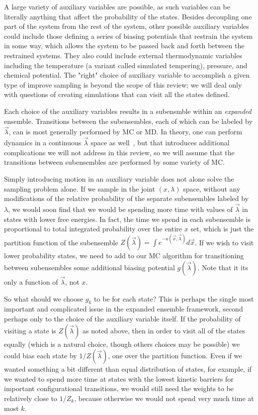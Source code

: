 \documentclass[superscriptaddress,showkeys, nofootinbib, pre, aps]{revtex4-1}
\begin{document}
A large variety of auxiliary variables are possible, as such variables can be literally anything that affect the probability of the states. Besides decoupling one part of the system from the rest of the system, other possible auxiliary variables could include those defining a series of biasing potentials that restrain the system in some way, which allows the system to be passed back and forth between the restrained systems. They also could include external thermodynamic variables including the temperature (a variant called simulated tempering), pressure, and chemical potential.  The "right" choice of auxiliary variable to accomplish a given type of improve sampling is beyond the scope of this review; we will deal only with questions of creating simulations that can visit all the states defined.

Each choice of the auxiliary variables results in a subensmble within an \emph{expanded}
ensemble.  Transitions between the subensembles, each of which can be labeled by $\vec{\lambda}$, can is most generally performed by MC or MD. In theory, one can perform dynamics in a continuous $\vec{\lambda}$ space as well~\cite{lambda_dynamics}, but that introduces additional complications we will not address in this review, so we will assume that the transitions between subensembles are performed by some variety of MC.

Simply introducing motion in an auxiliary variable does not alone solve the sampling problem alone. If we sample in the joint $(x,\lambda)$ space, without any modifications of the relative probability of the separate subensembles labeled by $\lambda$, we would soon find that we would be spending more time with values of $\vec{\lambda}$ in states with lower free energies. In fact, the time we spend in each subensemble is proportional to total integrated probability over the entire $x$ set, which is just the partition function of the subensemble $Z(\vec{\lambda}) = \int e^{-u(\vec{x},\vec{\lambda})} d\vec{x}$. If we wish to visit lower probability states, we need to add to our MC algorithm for transitioning between subensembles some additional biasing potential $g(\vec{\lambda})$. Note that it its only a function of $\vec{\lambda}$, not $x$.  

So what should we choose $g_k$ to be for each state? This is perhaps the single most important and complicated issue in the expanded ensemble framework, second perhaps only to the choice of the auxiliary variable itself. If the probability of visiting a state is $Z(\vec{\lambda})$ as noted above, then in order to visit all of the states equally (which is a natural choice, though others choices may be possible) we could bias each state by $1/Z(\vec{\lambda})$, one over the partition function. Even if we wanted something a bit different than equal distribution of states, for example, if we wanted to spend more time at states with the lowest kinetic barriers for important configurational transitions, we would still need the weights to be relatively close to $1/Z_k$, because otherwise we would not spend very much time at most $k$. 
\end{document}
